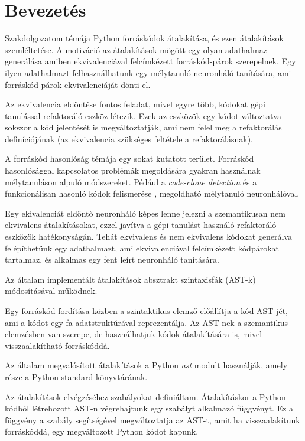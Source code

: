 \chapter{Bevezetés}
\label{ch:intro}

Szakdolgozatom témája Python forráskódok átalakítása, és ezen átalakítások szemléltetése.
A motiváció az átalakítások mögött egy olyan adathalmaz generálása amiben
ekvivalenciával felcímkézett forráskód-párok szerepelnek.
Egy ilyen adathalmazt felhasználhatunk egy mélytanuló
neuronháló tanítására, ami forráskód-párok ekvivalenciáját dönti el.

Az ekvivalencia eldöntése fontos feladat, mivel egyre több, kódokat gépi tanulással refaktoráló eszköz létezik.
Ezek az eszközök egy kódot változtatva sokszor a kód jelentését is megváltoztatják, ami nem felel meg
a refaktorálás definíciójának (az ekvivalencia szükséges feltétele a refaktorálásnak).

A forráskód hasonlóság témája egy sokat kutatott terület.
Forráskód hasonlósággal kapcsolatos problémák megoldására gyakran használnak mélytanuláson alpuló módszereket.
Pédául a \emph{code-clone detection} \cite{CCLearner} és a funkcionálisan hasonló kódok felismerése \cite{DeepSim}, \cite{ContrastiveCodeRepr}
megoldható mélytanuló neuronhálóval.

Egy ekivalenciát eldöntő neuronháló képes lenne jelezni a szemantikusan nem ekvivalens átalakításokat,
ezzel javítva a gépi tanulást használó refaktoráló eszközök hatékonyságán.
Tehát ekvivalens és nem ekvivalens kódokat generálva felépíthetünk egy adathalmazt, ami
ekvivalenciával felcímkézett kódpárokat tartalmaz, és alkalmas egy fent leírt neuronháló
tanítására.

Az általam implementált átalakítások absztrakt szintaxisfák (AST-k) módosításával működnek.

Egy forráskód fordítása közben a szintaktikus elemző előállítja a kód AST-jét,
ami a kódot egy fa adatstruktúrával reprezentálja.
Az AST-nek a szemantikus elemzésben van szerepe,
de használhatjuk kódok átalakítására is, mivel visszaalakítható forráskóddá.

Az általam megvalósított átalakítások a Python \emph{ast} modult \cite{pythonAST} használják,
amely része a Python standard könyvtárának.

Az átalakítások elvégzéséhez szabályokat definiáltam.
Átalakításkor a Python kódból létrehozott AST-n végrehajtunk egy szabályt alkalmazó függvényt.
Ez a függvény a szabály segítségével megváltoztatja az AST-t, amit ha visszaalakítunk forráskóddá,
egy megváltozott Python kódot kapunk.

